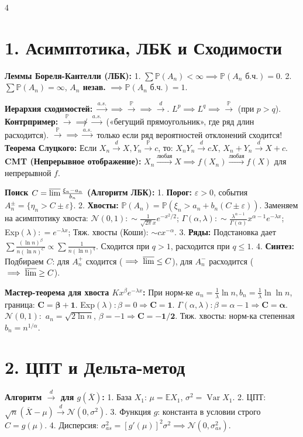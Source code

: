 \documentclass[8pt, a4paper, landscape]{extarticle}
\newcommand{\E}{\mathbb{E}}
\renewcommand{\P}{\mathbb{P}}
\DeclareMathOperator{\Var}{Var}
\newcommand{\toP}{\xrightarrow{\P}}
\newcommand{\toD}{\xrightarrow{d}}
\newcommand{\toAS}{\xrightarrow{a.s.}}
\newcommand{\N}{\mathcal{N}}
\begin{document}
\begin{multicols*}{4}

\section*{1. Асимптотика, ЛБК и Сходимости}
\textbf{Леммы Бореля-Кантелли (ЛБК):}
1. $\sum \P(A_n) < \infty \implies \P(A_n \text{ б.ч.}) = 0$.
2. $\sum \P(A_n) = \infty$, \textbf{$A_n$ незав.} $\implies \P(A_n \text{ б.ч.}) = 1$.

\textbf{Иерархия сходимостей:} $\toAS \implies \toP \implies \toD$. $L^p \implies L^q \implies \toP$ (при $p>q$).
\textbf{Контрпример:} $\toP \not\implies \toAS$ («бегущий прямоугольник», где ряд длин расходится). $\toP \implies \toAS$ только если ряд вероятностей отклонений сходится!
\textbf{Теорема Слуцкого:} Если $X_n \toD X, Y_n \toP c$, то: $X_n Y_n \toD cX$, $X_n + Y_n \toD X + c$.
\textbf{CMT (Непрерывное отображение):} $X_n \xrightarrow{\text{любая}} X \implies f(X_n) \xrightarrow{\text{любая}} f(X)$ для непрерывной $f$.

\textbf{Поиск $C = \varlimsup \frac{\xi_n - a_n}{b_n}$ (Алгоритм ЛБК):}
1. \textbf{Порог:} $\varepsilon>0$, события $A_n^\pm = \{ \eta_n > C \pm \varepsilon \}$.
2. \textbf{Хвосты:} $\P(A_n) = \P(\xi_n > a_n \!+\! b_n(C \pm \varepsilon))$. Заменяем на асимптотику хвоста:
$\N(0,1): \sim \frac{1}{\sqrt{2\pi} x} e^{-x^2/2}$; $\Gamma(\alpha, \lambda): \sim \frac{\lambda^{\alpha-1}}{\Gamma(\alpha)} x^{\alpha-1} e^{-\lambda x}$;
Exp$(\lambda): = e^{-\lambda x}$; Тяж. хвосты (Коши): $\sim c x^{-\alpha}$.
3. \textbf{Ряды:} Подстановка дает $\sum \frac{(\ln n)^\beta}{n(\ln n)^C} \propto \sum \frac{1}{n(\ln n)^q}$. Сходится при $q>1$, расходится при $q \le 1$.
4. \textbf{Синтез:} Подбираем $C$: для $A_n^+$ сходится ($\implies \varlimsup \le C$), для $A_n^-$ расходится ($\implies \varlimsup \ge C$).

\textbf{Мастер-теорема для хвоста $K x^\beta e^{-\lambda x}$:}
При норм-ке $a_n \!=\! \frac{1}{\lambda}\ln n, b_n \!=\! \frac{1}{\lambda}\ln\ln n$, граница: $\mathbf{C = \beta \!+\! 1}$.
Exp$(\lambda): \beta=0 \Rightarrow \mathbf{C=1}$. $\Gamma(\alpha, \lambda): \beta=\alpha-1 \Rightarrow \mathbf{C=\alpha}$.
$\N(0,1):$ $a_n=\sqrt{2\ln n}$, $\beta=-1 \Rightarrow \mathbf{C=-1/2}$. Тяж. хвосты: норм-ка степенная $b_n=n^{1/\alpha}$.

\section*{2. ЦПТ и Дельта-метод}
\textbf{Алгоритм $\toD$ для $g(\overline{X})$:}
1. База $X_1$: $\mu = \E X_1$, $\sigma^2 = \Var X_1$.
2. ЦПТ: $\sqrt{n}(\overline{X} - \mu) \toD \N(0, \sigma^2)$.
3. Функция $g$: константа в условии строго $C = g(\mu)$.
4. Дисперсия: $\sigma_{as}^2 = [g'(\mu)]^2 \sigma^2 \implies \N(0, \sigma_{as}^2)$.


\end{multicols*}
\end{document}
